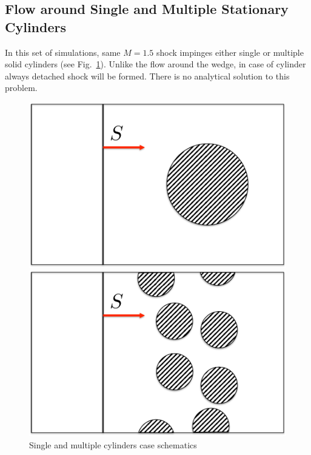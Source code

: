 \subsection{Flow around Single and Multiple Stationary Cylinders}
In this set of simulations, same $M=1.5$ shock impinges either single or multiple solid cylinders (see Fig.~\ref{fig:cyl_scheme}). Unlike the flow around the wedge, in case of cylinder always detached shock will be formed. There is no analytical solution to this problem.
\begin{figure}[t]
\begin{minipage}{0.5\linewidth}
\includegraphics[scale=0.4]{fig/single_cyl.pdf}
\end{minipage}
\begin{minipage}{0.5\linewidth}
\includegraphics[scale=0.4]{fig/mul_cyl.pdf}
\end{minipage}
\caption{Single and multiple cylinders case schematics} \label{fig:cyl_scheme}
\end{figure}\\
